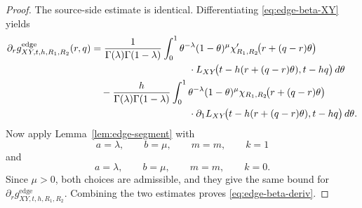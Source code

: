\documentclass[11pt,a4paper]{amsart}
\theoremstyle{plain}
\theoremstyle{definition}
\theoremstyle{remark}
\begin{document}
\begin{proof}
The source-side estimate is identical. Differentiating \eqref{eq:edge-beta-XY} yields
\begin{align*}
\partial_r g_{XY,t,h,R_1,R_2}^{\mathrm{edge}}(r,q)
&=
\frac{1}{\Gamma(\lambda)\Gamma(1-\lambda)}
\int_0^1
\theta^{-\lambda}(1-\theta)^{\mu}
\chi_{R_1,R_2}'\!\bigl(r+(q-r)\theta\bigr)
\notag\\
&\qquad\qquad\qquad\qquad\qquad\cdot
L_{XY}\!\bigl(t-h(r+(q-r)\theta),t-hq\bigr)\,d\theta
\notag\\
&\quad-
\frac{h}{\Gamma(\lambda)\Gamma(1-\lambda)}
\int_0^1
\theta^{-\lambda}(1-\theta)^{\mu}
\chi_{R_1,R_2}\!\bigl(r+(q-r)\theta\bigr)
\notag\\
&\qquad\qquad\qquad\qquad\qquad\cdot
\partial_1L_{XY}\!\bigl(t-h(r+(q-r)\theta),t-hq\bigr)\,d\theta.
\end{align*}
Now apply Lemma~\ref{lem:edge-segment} with
\[
a=\lambda,\qquad b=\mu,\qquad m=m,\qquad k=1
\]
and
\[
a=\lambda,\qquad b=\mu,\qquad m=m,\qquad k=0.
\]
Since \(\mu>0\), both choices are admissible, and they give the same bound for
\(\partial_r g_{XY,t,h,R_1,R_2}^{\mathrm{edge}}\). Combining the two estimates proves
\eqref{eq:edge-beta-deriv}.
\end{proof}
\end{document}
